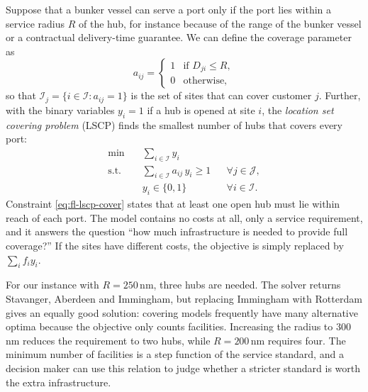 Suppose that a bunker vessel can serve a port only if the port lies within a service radius $R$ of the hub, for instance because of the range of the bunker vessel or a contractual delivery-time guarantee. We can define the coverage parameter as
\begin{equation*}
  a_{ij} =
  \begin{cases}
    1 & \text{if } D_{ji}\le R,\\
    0 & \text{otherwise,}
  \end{cases}
\end{equation*}
so that $\mathcal{I}_j=\{i\in\mathcal{I}: a_{ij}=1\}$ is the set of sites that can cover customer $j$. Further, with the binary variables $y_i=1$ if a hub is opened at site $i$, the \emph{location set covering problem} (LSCP) finds the smallest number of hubs that covers every port:
\begin{align}
  \min\quad & \sum_{i\in\mathcal{I}} y_i \label{eq:fl-lscp-obj}\\
  \text{s.t.}\quad & \sum_{i\in\mathcal{I}} a_{ij}\, y_i \ge 1 && \forall j\in\mathcal{J}, \label{eq:fl-lscp-cover}\\
  & y_i\in\{0,1\} && \forall i\in\mathcal{I}. \nonumber
\end{align}
Constraint \eqref{eq:fl-lscp-cover} states that at least one open hub must lie within reach of each port. The model contains no costs at all, only a service requirement, and it answers the question ``how much infrastructure is needed to provide full coverage?'' If the sites have different costs, the objective is simply replaced by $\sum_i f_i y_i$.

For our instance with $R=250$\,nm, three hubs are needed. The solver returns Stavanger, Aberdeen and Immingham, but replacing Immingham with Rotterdam gives an equally good solution: covering models frequently have many alternative optima because the objective only counts facilities. Increasing the radius to 300\,nm reduces the requirement to two hubs, while $R=200$\,nm requires four. The minimum number of facilities is a step function of the service standard, and a decision maker can use this relation to judge whether a stricter standard is worth the extra infrastructure.

